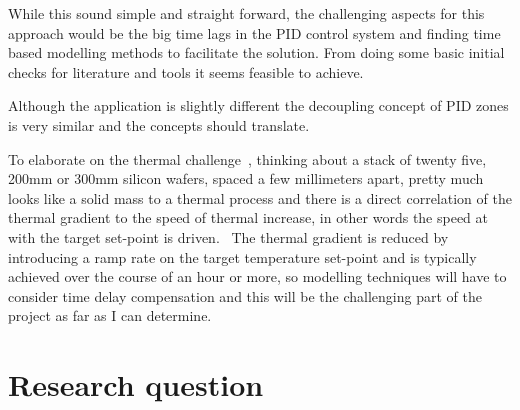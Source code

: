     While this sound simple and straight forward, the challenging aspects for this
    approach would be the big time lags in the PID control system and ﬁnding time based 
    modelling methods to facilitate the solution. From doing some basic initial 
    checks for literature and tools it seems feasible to achieve.
    ~\cite{InprocDecoupledPIDNeeuralNet}

    Although the application is slightly different the decoupling concept of PID 
    zones is very similar and the concepts should translate. 
    
    To elaborate on the thermal challenge~\cite{LargeWaferThermalBahaviour}, thinking 
    about a stack of twenty ﬁve, 200mm or 300mm silicon wafers, spaced a few 
    millimeters apart, pretty much 
    looks like a solid mass to a thermal process and there is a direct correlation 
    of the thermal gradient to the speed of thermal increase, in other words the 
    speed at with the target set-point is driven.~\cite{WaferThermalUniformity} 
    The thermal gradient is reduced by 
    introducing a ramp rate on the target temperature set-point and is typically achieved 
    over the course of an hour or more, so modelling techniques will have to consider 
    time delay compensation and this will be the challenging part of the project as 
    far as I can determine.~\cite{InprocDecoupledPIDNeeuralNet}
 

    
    \label{section:literature}

  \section{Research question}
    

